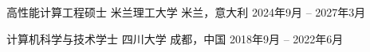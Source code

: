 

\begin{cventries}

  \cventry
    {高性能计算工程硕士}
    {米兰理工大学}
    {米兰，意大利}
    {2024年9月 -- 2027年3月}
    {}

  \cventry
    {计算机科学与技术学士}
    {四川大学}
    {成都，中国}
    {2018年9月 -- 2022年6月}
    {}

\end{cventries}
